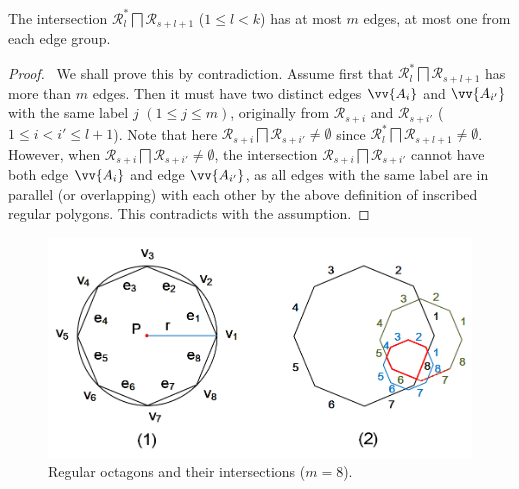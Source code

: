\begin{prop}
\label{prop-rp-intersection}
The intersection $\mathcal{R}^*_{l} \bigsqcap \mathcal{R}_{s+l+1}$ ($ 1\le l< k$) has at most $m$ edges, \ie at most one from each edge group.
\end{prop}





\begin{proof}\
We shall prove this by contradiction.
Assume first that $\mathcal{R}^*_{l} \bigsqcap \mathcal{R}_{s+l+1}$ has more than $m$ edges. Then it must have two distinct edges $\vv{A_i}$ and $\vv{A_{i'}}$  with the same label $j$ $(1\le j \le m)$, originally from
$\mathcal{R}_{s+i}$ and $\mathcal{R}_{s+i'}$  ($1\le i< i' \le l+1$).
%
Note that here $\mathcal{R}_{s+i} \bigsqcap \mathcal{R}_{s+i'} \ne \emptyset$ since $\mathcal{R}^*_l \bigsqcap \mathcal{R}_{s+l+1} \ne \emptyset$.
%
However, when $\mathcal{R}_{s+i} \bigsqcap \mathcal{R}_{s+i'} \ne \emptyset$, the intersection $\mathcal{R}_{s+i} \bigsqcap \mathcal{R}_{s+i'}$ cannot have
both edge $\vv{A_i}$ and edge $\vv{A_{i'}}$, as  all edges with the same label are in parallel (or overlapping) with each other by the above definition of inscribed regular polygons. This contradicts with the assumption. \eop
\end{proof}


\begin{figure}[tb!]
	\centering
	\includegraphics[scale=0.85]{figures/Fig-polygons.png}
	\vspace{0ex}
	\caption{\small Regular octagons and their intersections ($m =8$).}
	\vspace{-1ex}
	\label{fig:polygons}
\end{figure}

